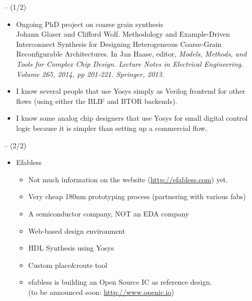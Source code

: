 \begin{frame}{\subsecname{} -- (1/2)}
\begin{itemize}
\item Ongoing PhD project on coarse grain synthesis \\
{\setlength{\parindent}{0.5cm}\footnotesize
Johann Glaser and Clifford Wolf. Methodology and Example-Driven Interconnect
Synthesis for Designing Heterogeneous Coarse-Grain Reconfigurable
Architectures. In Jan Haase, editor, \it Models, Methods, and Tools for Complex
Chip Design. Lecture Notes in Electrical Engineering. Volume 265, 2014, pp
201-221. Springer, 2013.}

\bigskip
\item I know several people that use Yosys simply as Verilog frontend for other
flows (using either the BLIF and BTOR backends).

\bigskip
\item I know some analog chip designers that use Yosys for small digital
control logic because it is simpler than setting up a commercial flow.
\end{itemize}
\end{frame}

\begin{frame}{\subsecname{} -- (2/2)}
\begin{itemize}
\item Efabless
\begin{itemize}
\smallskip \item Not much information on the website (\url{http://efabless.com}) yet.
\smallskip \item Very cheap 180nm prototyping process (partnering with various fabs)
\smallskip \item A semiconductor company, NOT an EDA company
\smallskip \item Web-based design environment
\smallskip \item HDL Synthesis using Yosys
\smallskip \item Custom place\&route tool

\bigskip
\item efabless is building an Open Source IC as reference design. \\
\hskip1cm (to be announced soon: \url{http://www.openic.io})
\end{itemize}
\end{itemize}
\end{frame}



